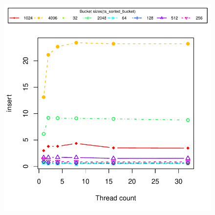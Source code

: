 \begin{landscape}
\begin{figure}[H]
{        \includegraphics[width=1.0\textwidth]{plots/c2d/plot_1_ts_sorted_bucketinsert}
    }
\end{figure}
\end{landscape}
